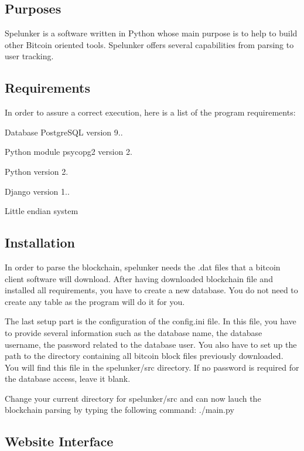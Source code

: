 \subsection*{Purposes }

Spelunker is a software written in Python whose main purpose is to help to build other Bitcoin oriented tools. Spelunker offers several capabilities from parsing to user tracking.

\subsection*{Requirements }

In order to assure a correct execution, here is a list of the program requirements\+:
\begin{DoxyItemize}
\item Database Postgre\+S\+Q\+L version 9..
\item Python module psycopg2 version 2.
\item Python version 2.
\item Django version 1..
\item Little endian system
\end{DoxyItemize}

\subsection*{Installation }

In order to parse the blockchain, spelunker needs the .dat files that a bitcoin client software will download. After having downloaded blockchain file and installed all requirements, you have to create a new database. You do not need to create any table as the program will do it for you.

The last setup part is the configuration of the config.\+ini file. In this file, you have to provide several information such as the database name, the database username, the password related to the database user. You also have to set up the path to the directory containing all bitcoin block files previously downloaded. You will find this file in the spelunker/src directory. If no password is required for the database access, leave it blank.

Change your current directory for spelunker/src and can now lauch the blockchain parsing by typing the following command\+: ./main.py

\subsection*{Website Interface }

